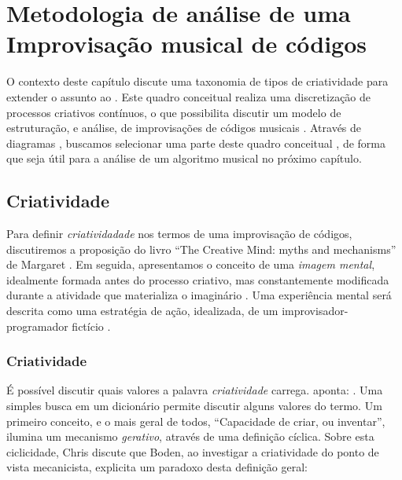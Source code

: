 \chapter{Metodologia de análise de uma Improvisação musical de códigos}\label{cap:metodologia}

O contexto deste capítulo discute uma taxonomia de tipos de criatividade  para extender o assunto ao  . Este quadro conceitual realiza uma discretização de processos criativos contínuos, o que possibilita discutir um modelo de estruturação, e análise, de improvisações de códigos musicais . Através de diagramas , buscamos selecionar uma parte deste quadro conceitual , de forma que seja útil para a análise de um algoritmo musical no próximo capítulo.

\section{Criatividade}\label{sec:criatividade}

Para  definir \emph{criatividadade} nos termos de uma improvisação de códigos, discutiremos a proposição do livro ``The Creative Mind: myths and mechanisms'' de Margaret   . Em seguida, apresentamos o conceito de uma \emph{imagem mental}, idealmente formada antes do processo criativo, mas constantemente modificada durante a atividade que materializa o imaginário . Uma experiência mental será descrita como uma estratégia de ação, idealizada, de um improvisador-programador fictício . 

\subsection{Criatividade}\label{sec:diferencas}

É possível discutir quais valores a palavra \emph{criatividade} carrega.  aponta: . Uma simples busca em um dicionário  permite discutir alguns valores do termo. Um primeiro conceito, e o mais geral de todos, ``Capacidade de criar, ou inventar'', ilumina um mecanismo \emph{gerativo}, através de uma definição cíclica. Sobre esta ciclicidade, Chris  discute que Boden, ao investigar a criatividade do ponto de vista mecanicista, explicita um paradoxo desta definição geral:

